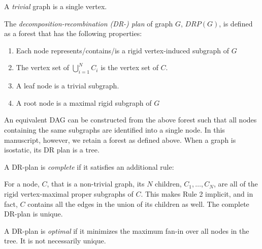 A {\em trivial} graph is   a single vertex.
\begin{definition}\label{def:drp}
    The  {\em decomposition-recombination \mbox{(DR-)} plan} of graph $G$,
    \cite{XX}
    $DRP(G)$, is defined as a forest that has the following properties:
    \begin{enumerate}
        \item Each  node represents/contains/is  a rigid vertex-induced subgraph of $G$
        \item The vertex set of $\bigcup_{i=1}^N{C_i}$ is the 
            vertex set of $C$.
        \item A leaf node is a trivial subgraph.
       \item A root node is a maximal rigid subgraph of $G$
    \end{enumerate}


    An equivalent DAG can be constructed from the above forest such that all nodes
    containing the same subgraphs are identified into a single node.
    In this manuscript, however, we retain a forest as defined above.
    When a graph is isostatic, its DR plan is a tree.


    A DR-plan is {\em complete} if it satisfies an additional rule: 
        \item For a node, $C$, that is  a non-trivial graph, its $N$
            children, $C_1, \ldots, C_N$, are all of the 
            rigid vertex-maximal proper subgraphs of $C$.
    This makes Rule 2 implicit, and in fact, $C$ contains all the edges in
    the union of its children as well. The complete DR-plan is unique.

    A DR-plan is {\em optimal} if it minimizes the maximum fan-in over all nodes in the tree. It is not necessarily unique.
\end{definition}


